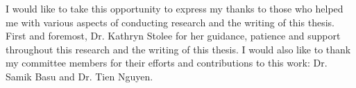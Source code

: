 \cleardoublepage {}
{}

I would like to take this opportunity to express my thanks to those
who helped me with various aspects of conducting research and the writing
of this thesis.
First and foremost, Dr. Kathryn Stolee for her guidance, patience and support
throughout this research and the writing of this thesis.
I would also like to thank my committee members for their efforts
and contributions to this work: Dr. Samik Basu and
Dr. Tien Nguyen.
